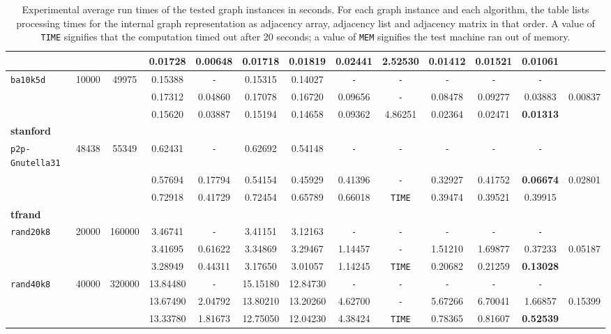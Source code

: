 \begin{table}
{\begin{tabular}{ l c c | c c c c c c c c c || c }
 &  &  & 0.01728 & \textbf{0.00648} & 0.01718 & 0.01819 & 0.02441 & 2.52530 & 0.01412 & 0.01521 & 0.01061 & \\
\hline
\verb|ba10k5d| & 10000 & 49975 & 0.15388 & \verb|-| & 0.15315 & 0.14027 & \verb|-| & \verb|-| & \verb|-| & \verb|-| & \verb|-| & \\
 &  &  & 0.17312 & 0.04860 & 0.17078 & 0.16720 & 0.09656 & \verb|-| & 0.08478 & 0.09277 & 0.03883 & 0.00837 \\
 &  &  & 0.15620 & 0.03887 & 0.15194 & 0.14658 & 0.09362 & 4.86251 & 0.02364 & 0.02471 & \textbf{0.01313} & \\
\hline
\multicolumn{13}{l}{\textbf{stanford}} \\
\hline
\verb|p2p-Gnutella31| & 48438 & 55349 & 0.62431 & \verb|-| & 0.62692 & 0.54148 & \verb|-| & \verb|-| & \verb|-| & \verb|-| & \verb|-| & \\
 &  &  & 0.57694 & 0.17794 & 0.54154 & 0.45929 & 0.41396 & \verb|-| & 0.32927 & 0.41752 & \textbf{0.06674} & 0.02801 \\
 &  &  & 0.72918 & 0.41729 & 0.72454 & 0.65789 & 0.66018 & \verb|TIME| & 0.39474 & 0.39521 & 0.39915 & \\
\hline
\multicolumn{13}{l}{\textbf{tfrand}} \\
\hline
\verb|rand20k8| & 20000 & 160000 & 3.46741 & \verb|-| & 3.41151 & 3.12163 & \verb|-| & \verb|-| & \verb|-| & \verb|-| & \verb|-| & \\
 &  &  & 3.41695 & 0.61622 & 3.34869 & 3.29467 & 1.14457 & \verb|-| & 1.51210 & 1.69877 & 0.37233 & 0.05187 \\
 &  &  & 3.28949 & 0.44311 & 3.17650 & 3.01057 & 1.14245 & \verb|TIME| & 0.20682 & 0.21259 & \textbf{0.13028} & \\
\hline
\verb|rand40k8| & 40000 & 320000 & 13.84480 & \verb|-| & 15.15180 & 12.84730 & \verb|-| & \verb|-| & \verb|-| & \verb|-| & \verb|-| & \\
 &  &  & 13.67490 & 2.04792 & 13.80210 & 13.20260 & 4.62700 & \verb|-| & 5.67266 & 6.70041 & 1.66857 & 0.15399 \\
 &  &  & 13.33780 & 1.81673 & 12.75050 & 12.04230 & 4.38424 & \verb|TIME| & 0.78365 & 0.81607 & \textbf{0.52539} & \\
\hline
  \end{tabular}
}
\caption{Experimental average run times of the tested graph instances in seconds. For each graph instance and each algorithm, the table lists processing times for the internal graph representation as adjacency array, adjacency list and adjacency matrix in that order. A value of \texttt{TIME} signifies that the computation timed out after 20 seconds; a value of \texttt{MEM} signifies the test machine ran out of memory.}
\label{results}
\end{table}

